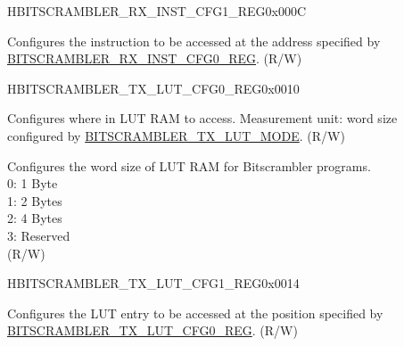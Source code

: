 \begin{register}{H}{BITSCRAMBLER\_RX\_INST\_CFG1\_REG}{0x000C}\label{regdesc:BITSCRAMBLERRXINSTCFG1REG}
%
\regnewline%
\begin{regdesc}\begin{reglist}
\label{fielddesc:BITSCRAMBLERRXINST}\item [BITSCRAMBLER\_RX\_INST] Configures the instruction to be accessed at the address specified by \hyperref[regdesc:BITSCRAMBLERRXINSTCFG0REG]{BITSCRAMBLER\_RX\_INST\_CFG0\_REG}. (R/W)
\end{reglist}\end{regdesc}
\end{register}


\begin{register}{H}{BITSCRAMBLER\_TX\_LUT\_CFG0\_REG}{0x0010}\label{regdesc:BITSCRAMBLERTXLUTCFG0REG}
%
%
%
\regnewline%
\begin{regdesc}\begin{reglist}
\label{fielddesc:BITSCRAMBLERTXLUTIDX}\item [BITSCRAMBLER\_TX\_LUT\_IDX] Configures where in LUT RAM to access. Measurement unit: word size configured by \hyperref[fielddesc:BITSCRAMBLERTXLUTMODE]{BITSCRAMBLER\_TX\_LUT\_MODE}. (R/W)
\label{fielddesc:BITSCRAMBLERTXLUTMODE}\item [BITSCRAMBLER\_TX\_LUT\_MODE] Configures the word size of LUT RAM for Bitscrambler programs. \\
0: 1 Byte\\
1: 2 Bytes\\
2: 4 Bytes\\
3: Reserved\\
(R/W)
\end{reglist}\end{regdesc}
\end{register}


\begin{register}{H}{BITSCRAMBLER\_TX\_LUT\_CFG1\_REG}{0x0014}\label{regdesc:BITSCRAMBLERTXLUTCFG1REG}
%
\regnewline%
\begin{regdesc}\begin{reglist}
\label{fielddesc:BITSCRAMBLERTXLUT}\item [BITSCRAMBLER\_TX\_LUT] Configures the LUT entry to be accessed at the position specified by \hyperref[regdesc:BITSCRAMBLERTXLUTCFG0REG]{BITSCRAMBLER\_TX\_LUT\_CFG0\_REG}. (R/W)
\end{reglist}\end{regdesc}
\end{register}


